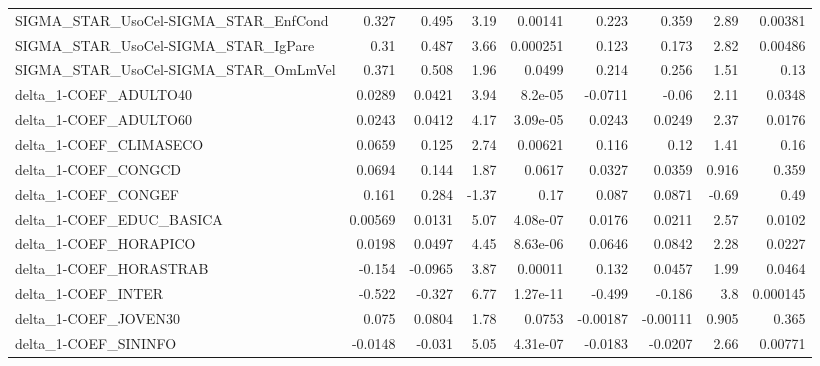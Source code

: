 \begin{tabular}{lrrrrrrrr}
SIGMA\_STAR\_UsoCel-SIGMA\_STAR\_EnfCond  &       0.327 &        0.495 &    3.19 &  0.00141 &      0.223 &       0.359 &         2.89 &       0.00381 \\
SIGMA\_STAR\_UsoCel-SIGMA\_STAR\_IgPare   &        0.31 &        0.487 &    3.66 & 0.000251 &      0.123 &       0.173 &         2.82 &       0.00486 \\
SIGMA\_STAR\_UsoCel-SIGMA\_STAR\_OmLmVel  &       0.371 &        0.508 &    1.96 &   0.0499 &      0.214 &       0.256 &         1.51 &          0.13 \\
delta\_1-COEF\_ADULTO40                 &      0.0289 &       0.0421 &    3.94 &  8.2e-05 &    -0.0711 &       -0.06 &         2.11 &        0.0348 \\
delta\_1-COEF\_ADULTO60                 &      0.0243 &       0.0412 &    4.17 & 3.09e-05 &     0.0243 &      0.0249 &         2.37 &        0.0176 \\
delta\_1-COEF\_CLIMASECO                &      0.0659 &        0.125 &    2.74 &  0.00621 &      0.116 &        0.12 &         1.41 &          0.16 \\
delta\_1-COEF\_CONGCD                   &      0.0694 &        0.144 &    1.87 &   0.0617 &     0.0327 &      0.0359 &        0.916 &         0.359 \\
delta\_1-COEF\_CONGEF                   &       0.161 &        0.284 &   -1.37 &     0.17 &      0.087 &      0.0871 &        -0.69 &          0.49 \\
delta\_1-COEF\_EDUC\_BASICA              &     0.00569 &       0.0131 &    5.07 & 4.08e-07 &     0.0176 &      0.0211 &         2.57 &        0.0102 \\
delta\_1-COEF\_HORAPICO                 &      0.0198 &       0.0497 &    4.45 & 8.63e-06 &     0.0646 &      0.0842 &         2.28 &        0.0227 \\
delta\_1-COEF\_HORASTRAB                &      -0.154 &      -0.0965 &    3.87 &  0.00011 &      0.132 &      0.0457 &         1.99 &        0.0464 \\
delta\_1-COEF\_INTER                    &      -0.522 &       -0.327 &    6.77 & 1.27e-11 &     -0.499 &      -0.186 &          3.8 &      0.000145 \\
delta\_1-COEF\_JOVEN30                  &       0.075 &       0.0804 &    1.78 &   0.0753 &   -0.00187 &    -0.00111 &        0.905 &         0.365 \\
delta\_1-COEF\_SININFO                  &     -0.0148 &       -0.031 &    5.05 & 4.31e-07 &    -0.0183 &     -0.0207 &         2.66 &       0.00771 \\

\end{tabular}
